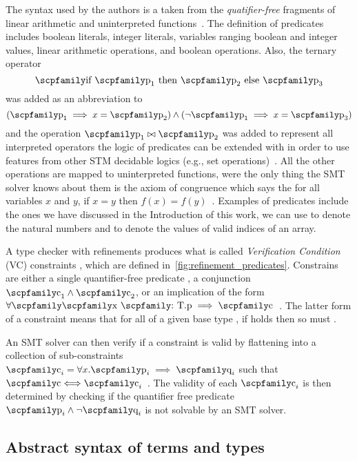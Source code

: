 \documentclass[
  oneside,
  english,
  coorientadorbanca,
  noabntexcite
]{ufsc-thesis-rn46-2019}
\newcommand{\codett}[1]{\text{\scpfamily#1}}
\newcommand{\code}[1]{\text{\scpfamily\setlength\spaceskip{0.35em}#1}}
\newcommand{\typer}[2]{\code{#1 \codett{:} #2}}
\begin{document}
The syntax used by the authors is a taken from the \textit{quatifier-free} fragments of linear arithmetic and uninterpreted functions~\cite{jhala2020tutorial}.
The definition of predicates \code{p} includes boolean literals, integer literals, variables ranging boolean and integer values, linear arithmetic operations, and boolean operations.
Also, the ternary operator
\begin{equation*}
  \code{if $\code{p}_1$ then $\code{p}_2$ else $\code{p}_3$}
\end{equation*}
was added as an abbreviation to
\begin{equation*}
  (\code{p}_1 \implies x = \code{p}_2)\land(\lnot \code{p}_1 \implies x = \code{p}_3)
\end{equation*}
and the operation $\code{p}_1\bowtie\code{p}_2$ was added to represent all interpreted operators the logic of predicates can be extended with in order to use features from other STM decidable logics (e.g., set operations)~\cite{jhala2020tutorial}.
All the other operations are mapped to uninterpreted functions, were the only thing the SMT solver knows about them is the axiom of congruence which says the for all variables $x$ and $y$, if $x = y$ then $f(x) = f(y)$~\cite{jhala2020tutorial}.
Examples of predicates include the ones we have discussed in the Introduction of this work, we can use \code{0 <= v} to denote the natural numbers and \code{0 <= v \&\& v = length(x)} to denote the values of valid indices of an array.

A type checker with refinements produces what is called \textit{Verification Condition} (VC) constraints \code{c}, which are defined in~\cref{fig:refinement_predicates}.
Constrains are either a single quantifier-free predicate \code{p}, a conjunction $\code{c}_1 \land \code{c}_2$, or an implication of the form $\forall\code{\typer{x}{T}.p}\implies\code{c}$~\cite{jhala2020tutorial}.
The latter form of a constraint means that for all \code{x} of a given base type \code{b}, if \code{p} holds then so must \code{c}.

An SMT solver can then verify if a constraint \code{c} is valid by flattening \code{c} into a collection of sub-constraints $\code{c}_i = \forall x. \code{p}_i \implies \code{q}_i$ such that $\code{c} \Longleftrightarrow \code{c}_i$~\cite{jhala2020tutorial}.
The validity of each $\code{c}_i$ is then determined by checking if the quantifier free predicate $\code{p}_i \land \lnot \code{q}_i$ is not solvable by an SMT solver.

\subsection{Abstract syntax of terms and types}
\end{document}
